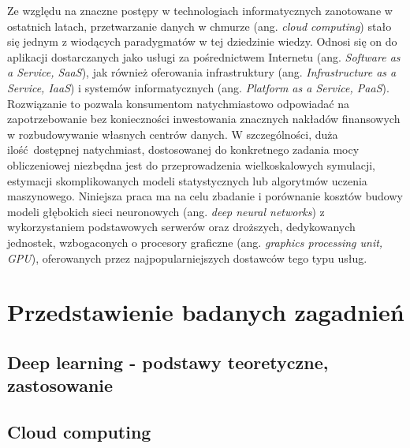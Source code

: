 \documentclass[12pt,a4paper,twoside]{article}
\begin{document}
Ze względu na znaczne postępy w technologiach informatycznych zanotowane w ostatnich latach, przetwarzanie danych w chmurze (ang. \textit{cloud computing}) stało się jednym z wiodących paradygmatów w tej dziedzinie wiedzy. Odnosi się on do aplikacji dostarczanych jako usługi za pośrednictwem Internetu (ang. \textit{Software as a Service, SaaS}), jak również oferowania infrastruktury (ang. \textit{Infrastructure as a Service, IaaS}) i systemów informatycznych (ang. \textit{Platform as a Service, PaaS}). Rozwiązanie to pozwala konsumentom natychmiastowo odpowiadać na zapotrzebowanie bez konieczności inwestowania znacznych nakładów finansowych w rozbudowywanie własnych centrów danych. W szczególności, duża ilość dostępnej natychmiast, dostosowanej do konkretnego zadania mocy obliczeniowej niezbędna jest do przeprowadzenia wielkoskalowych symulacji, estymacji skomplikowanych modeli statystycznych lub algorytmów uczenia maszynowego. Niniejsza praca ma na celu zbadanie i porównanie kosztów budowy modeli głębokich sieci neuronowych (ang. \textit{deep neural networks}) z wykorzystaniem podstawowych serwerów oraz droższych, dedykowanych jednostek, wzbogaconych o procesory graficzne (ang. \textit{graphics processing unit, GPU}), oferowanych przez najpopularniejszych dostawców tego typu usług.



\clearpage

\section{Przedstawienie badanych zagadnień}

\subsection{Deep learning - podstawy teoretyczne, zastosowanie}

\clearpage

\subsection{Cloud computing}

\end{document}
